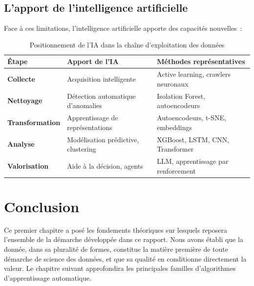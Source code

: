 \subsection{L'apport de l'intelligence artificielle}

Face à ces limitations, l'intelligence artificielle apporte des capacités nouvelles~:

\begin{table}[H]
\centering
\caption{Positionnement de l'IA dans la chaîne d'exploitation des données}
\label{tab:positionnement-ia}
\renewcommand{\arraystretch}{1.4}
\begin{tabularx}{\textwidth}{|>{\bfseries}p{2.5cm}|p{4cm}|X|}
\hline
\rowcolor{TableHeader}\textbf{Étape} & \textbf{Apport de l'IA} & \textbf{Méthodes représentatives} \\
\hline
Collecte & Acquisition intelligente & Active learning, crawlers neuronaux \\
\hline
Nettoyage & Détection automatique d'anomalies & Isolation Forest, autoencodeurs \\
\hline
Transformation & Apprentissage de représentations & Autoencodeurs, t-SNE, embeddings \\
\hline
Analyse & Modélisation prédictive, clustering & XGBoost, LSTM, CNN, Transformer \\
\hline
Valorisation & Aide à la décision, agents & LLM, apprentissage par renforcement \\
\hline
\end{tabularx}
\end{table}

\section{Conclusion}

Ce premier chapitre a posé les fondements théoriques sur lesquels reposera l'ensemble de la démarche développée dans ce rapport. Nous avons établi que la donnée, dans sa pluralité de formes, constitue la matière première de toute démarche de science des données, et que sa qualité en conditionne directement la valeur. Le chapitre suivant approfondira les principales familles d'algorithmes d'apprentissage automatique.

\newpage
